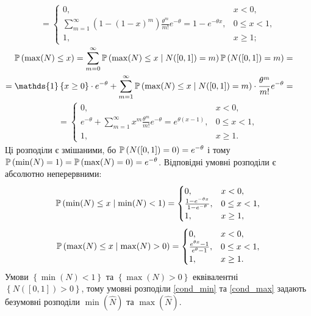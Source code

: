 \begin{gather}
    = \begin{cases}
        0, & x < 0, \\
        \sum_{m=1}^{\infty} \left(1 - (1 - x)^m\right) \frac{\theta^m}{m!} e^{-\theta} = 1 - e^{-\theta x}, & 0 \leq x < 1, \\
        1, & x \geq 1;
    \end{cases}
\end{gather}
$\begin{aligned}
    \P{\max(N) \leq x} = \sum_{m=0}^{\infty} \P{\max(N) \leq x \mid N([0, 1]) = m} \P{N([0, 1]) = m} = \\
     = \mathds{1}\left\{x\geq 0\right\}\cdot e^{-\theta} +
    \sum_{m=1}^{\infty} \P{\max(N) \leq x \mid N([0, 1]) = m} \cdot \frac{\theta^m}{m!} e^{-\theta} = \\
\end{aligned}$
\vspace{-10pt}
\begin{gather} 
    = \begin{cases}
        0, & x < 0, \\
        e^{-\theta} + \sum_{m=1}^{\infty} x^m \frac{\theta^m}{m!} e^{-\theta} = e^{\theta(x-1)}, & 0 \leq x < 1, \\
        1, & x \geq 1.
    \end{cases}
\end{gather}
Ці розподіли є змішаними, бо $\P{N([0, 1]) = 0} = e^{-\theta}$ і тому
$\P{\min(N) = 1} = \P{\max(N) = 0} = e^{-\theta}$. 
Відповідні умовні розподіли є абсолютно неперервними:
\begin{gather}\label{cond_min}
    \P{\min(N) \leq x \mid \min(N) < 1} = 
    \begin{cases}
        0, & x < 0, \\
        \frac{1-e^{-\theta x}}{1-e^{-\theta}}, & 0 \leq x < 1, \\
        1, & x \geq 1,
    \end{cases}
\end{gather}
\begin{gather}\label{cond_max}
    \P{\max(N) \leq x \mid \max(N) > 0} = 
    \begin{cases}
        0, & x < 0, \\
        \frac{e^{\theta x} - 1}{e^{\theta} - 1}, & 0 \leq x < 1, \\
        1, & x \geq 1.
    \end{cases}
\end{gather}
Умови $\left\{ \min(N) < 1\right\}$ та $\left\{ \max(N) > 0\right\}$
еквівалентні $\left\{N([0, 1]) > 0 \right\}$, тому 
умовні розподіли \eqref{cond_min} та \eqref{cond_max} 
задають безумовні розподіли $\min(\widehat{N})$ та $\max(\widehat{N})$.

